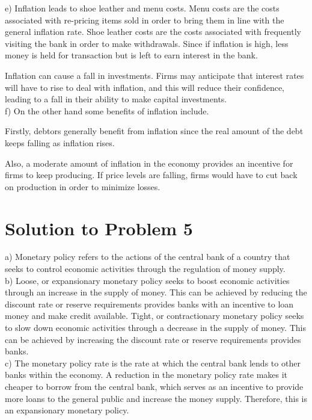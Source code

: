 \documentclass[12pt]{article}
\begin{document}
e) Inflation leads to shoe leather and menu costs. Menu costs are the costs associated with re-pricing items sold in order to bring them in line with the general inflation rate. Shoe leather costs are the costs associated with frequently visiting the bank in order to make withdrawals. Since if inflation is high, less money is held for transaction but is left to earn interest in the bank.

Inflation can cause a fall in investments. Firms may anticipate that interest rates will have to rise to deal with inflation, and this will reduce their confidence, leading to a fall in their ability to make capital investments.\\

f) On the other hand some benefits of inflation include.

Firstly, debtors generally benefit from inflation since the real amount of the debt keeps falling as inflation rises.

Also, a moderate amount of inflation in the economy provides an incentive for firms to keep producing. If price levels are falling, firms would have to cut back on production in order to minimize losses.

\section*{Solution to Problem 5}
a) Monetary policy refers to the actions of the central bank of a country that seeks to control economic activities through the regulation of money supply.\\

b) Loose, or expansionary monetary policy seeks to boost economic activities through an increase in the supply of money. This can be achieved by reducing the discount rate or reserve requirements provides banks with an incentive to loan money and make credit available. Tight, or contractionary monetary policy seeks to slow down economic activities through a decrease in the supply of money. This can be achieved by increasing the discount rate or reserve requirements provides banks.\\

c) The monetary policy rate is the rate at which the central bank lends to other banks within the economy. A reduction in the monetary policy rate makes it cheaper to borrow from the central bank, which serves as an incentive to provide more loans to the general public and increase the money supply. Therefore, this is an expansionary monetary policy.\\
\end{document}
